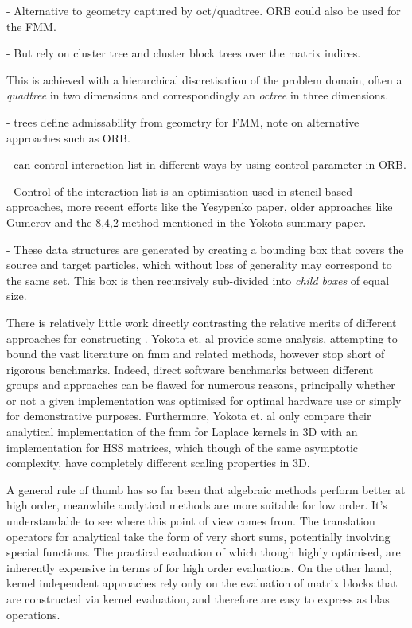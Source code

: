 - Alternative to geometry captured by oct/quadtree. ORB could also be used for the FMM.

- But rely on cluster tree and cluster block trees over the matrix indices.

This is achieved with a hierarchical discretisation of the problem domain, often a \textit{quadtree} in two dimensions and correspondingly an \textit{octree} in three dimensions.

- trees define admissability from geometry for FMM, note on alternative approaches such as ORB.

- can control interaction list in different ways by using control parameter in ORB.

- Control of the interaction list is an optimisation used in stencil based approaches, more recent efforts like the Yesypenko paper, older approaches like Gumerov and the 8,4,2 method mentioned in the Yokota summary paper.


- These data structures are generated by creating a bounding box that covers the source and target particles, which without loss of generality may correspond to the same set. This box is then recursively sub-divided into \textit{child boxes} of equal size.

There is relatively little work directly contrasting the relative merits of different approaches for constructing . Yokota et. al \cite{yokota2015fast} provide some analysis, attempting to bound the vast literature on \acrshort{fmm} and related methods, however stop short of rigorous benchmarks. Indeed, direct software benchmarks between different groups and approaches can be flawed for numerous reasons, principally whether or not a given implementation was optimised for optimal hardware use or simply for demonstrative purposes. Furthermore, Yokota et. al only compare their analytical implementation of the \acrshort{fmm} for Laplace kernels in 3D with an implementation for HSS matrices, which though of the same asymptotic complexity, have completely different scaling properties in 3D.

A general rule of thumb has so far been that algebraic methods perform better at high order, meanwhile analytical methods are more suitable for low order. It's understandable to see where this point of view comes from. The translation operators for analytical  take the form of very short sums, potentially involving special functions. The practical evaluation of which though highly optimised, are inherently expensive in terms of  for high order evaluations. On the other hand, kernel independent approaches rely only on the evaluation of matrix blocks that are constructed via kernel evaluation, and therefore are easy to express as \acrshort{blas} operations.

